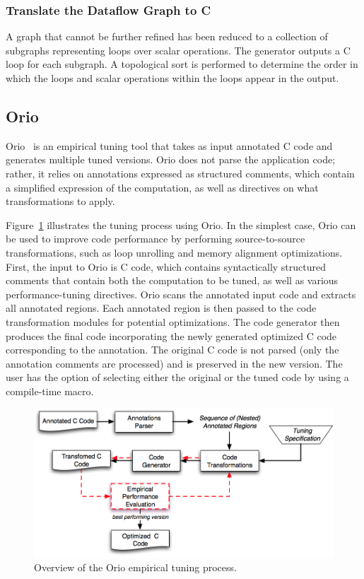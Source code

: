 \documentclass[11pt]{article}
\begin{document}
\subsubsection{Translate the Dataflow Graph to C}

A graph that cannot be further refined has been reduced to a collection of subgraphs representing loops over scalar operations. The generator outputs a C loop for each subgraph.  A topological sort is performed to determine the order in which the loops and scalar operations within the loops appear in the output.
\subsection{Orio}
\label{sec:orio}

Orio~\cite{Norris:2007} is an empirical tuning tool that takes as input annotated C code and generates multiple tuned versions. Orio does not parse the application code; rather, it relies on annotations expressed as structured comments, which contain a simplified expression of the computation, as well as directives on what transformations to apply.

Figure~\ref{fig:orio} illustrates the tuning process using Orio. In the simplest case, Orio can be used to improve code performance by performing source-to-source transformations, such as loop unrolling and memory alignment optimizations. First, the input to Orio is C code, which contains syntactically structured comments that contain both the computation to be tuned, as well as various performance-tuning directives. Orio scans the annotated input code and extracts all annotated regions. Each annotated region is then passed to the code transformation modules for potential optimizations. The code generator then produces the final code incorporating the newly generated optimized C code corresponding to the annotation. The original C code is not parsed (only the annotation comments are processed) and is preserved in the new version. The user has the option of selecting either the original or the tuned code by using a compile-time macro.



\begin{figure}[htbp]
\centering
\includegraphics[width=.7\textwidth]{figures/orio.png}
\caption{Overview of the Orio empirical tuning process.}
\label{fig:orio}
\end{figure}
\end{document}
